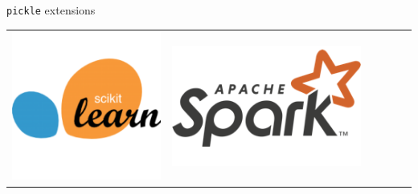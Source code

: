 \documentclass[13pt, usenames,dvipsnames]{beamer} %
\newcommand{\mycode}[2][\tiny] {\texttt{#2}}
\begin{document}
\begin{frame}[fragile]{\mycode[\small]{pickle} extensions}
{\begin{tabular}{m{3cm} m{1cm} m{1cm} m{1cm} m{1cm} m{1cm}}
            \includegraphics[width=\linewidth] {media/scikit-learn-logo.png} &
            \includegraphics[width=\linewidth] {media/spark-logo-hd.png} &

\end{tabular}}
\end{frame}
\end{document}
